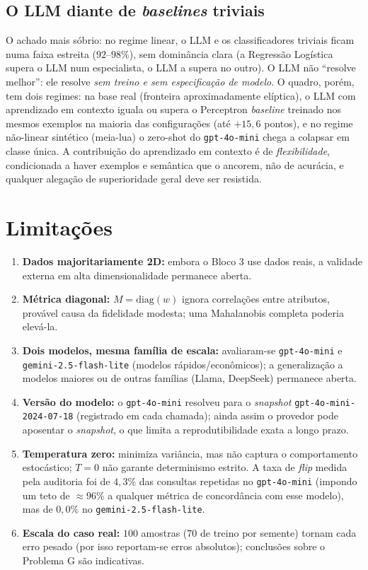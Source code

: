 \documentclass[12pt,a4paper]{article}
\begin{document}
\subsection{O LLM diante de \emph{baselines} triviais}
O achado mais sóbrio: no regime linear, o LLM e os classificadores triviais ficam numa
faixa estreita ($92$–$98\%$), sem dominância clara (a Regressão Logística supera o LLM num
especialista, o LLM a supera no outro). O LLM não ``resolve melhor'': ele resolve \emph{sem
treino e sem especificação de modelo}. O quadro, porém, tem dois regimes: na base real
(fronteira aproximadamente elíptica), o LLM com aprendizado em contexto iguala ou supera o Perceptron
\emph{baseline} treinado nos mesmos exemplos na maioria das configurações (até $+15{,}6$
pontos), e no regime não-linear sintético (meia-lua) o zero-shot do \texttt{gpt-4o-mini}
chega a colapsar em classe única. A contribuição do aprendizado em contexto é de
\emph{flexibilidade},
condicionada a haver exemplos e semântica que o ancorem, não de acurácia, e qualquer
alegação de superioridade geral deve ser resistida.

\section{Limitações}
\label{sec:limitacoes}

\begin{enumerate}
  \item \textbf{Dados majoritariamente 2D:} embora o Bloco 3 use dados reais, a validade
    externa em alta dimensionalidade permanece aberta.
  \item \textbf{Métrica diagonal:} $M=\mathrm{diag}(w)$ ignora correlações entre
    atributos, provável causa da fidelidade modesta; uma Mahalanobis completa poderia
    elevá-la.
  \item \textbf{Dois modelos, mesma família de escala:} avaliaram-se \texttt{gpt-4o-mini} e
    \texttt{gemini-2.5-flash-lite} (modelos rápidos/econômicos); a generalização a modelos
    maiores ou de outras famílias (Llama, DeepSeek) permanece aberta.
  \item \textbf{Versão do modelo:} o \texttt{gpt-4o-mini} resolveu para o \emph{snapshot}
    \texttt{gpt-4o-mini-2024-07-18} (registrado em cada chamada); ainda assim o provedor pode
    aposentar o \emph{snapshot}, o que limita a reprodutibilidade exata a longo prazo.
  \item \textbf{Temperatura zero:} minimiza variância, mas não captura o comportamento
    estocástico; $T=0$ não garante determinismo estrito. A taxa de \emph{flip} medida pela
    auditoria foi de $4{,}3\%$ das consultas repetidas no \texttt{gpt-4o-mini} (impondo um
    teto de $\approx 96\%$ a qualquer métrica de concordância com esse modelo), mas de
    $0{,}0\%$ no \texttt{gemini-2.5-flash-lite}.
  \item \textbf{Escala do caso real:} $100$ amostras ($70$ de treino por semente) tornam
    cada erro pesado (por
    isso reportam-se erros absolutos); conclusões sobre o Problema G são indicativas.
\end{enumerate}
\end{document}
